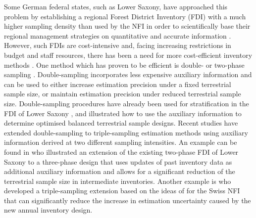Some German federal states, such as Lower Saxony, have approached this problem by establishing a regional Forest District Inventory (FDI) with a much higher sampling density than used by the NFI in order to scientifically base their regional management strategies on quantitative and accurate information \citep{bockmann1998}. However, such FDIs are cost-intensive and, facing increasing restrictions in budget and staff resources, there has been a need for more cost-efficient inventory methods \citep{vonluepke2013}. One method which has proven to be efficient is double- or two-phase sampling \citep{sarndal2003, gregoire2007, kohl2006, mandallaz2008}. Double-sampling incorporates less expensive auxiliary information and can be used to either increase estimation precision under a fixed terrestrial sample size, or maintain estimation precision under reduced terrestrial sample size. Double-sampling procedures have already been used for stratification in the FDI of Lower Saxony \citep{saborowski2010}, and \citet{grafstrom2017a} illustrated how to use the auxiliary information to determine optimised balanced terrestrial sample designs. Recent studies have extended double-sampling to triple-sampling estimation methods using auxiliary information derived at two different sampling intensities. An example can be found in \citet{vonLuepke2012} who illustrated an extension of the existing two-phase FDI of Lower Saxony to a three-phase design that uses updates of past inventory data as additional auxiliary information and allows for a significant reduction of the terrestrial sample size in intermediate inventories. Another example is \citet{massey2014a} who developed a triple-sampling extension based on the ideas of \citet{mandallaz2013c} for the Swiss NFI that can significantly reduce the increase in estimation uncertainty caused by the new annual inventory design.\par

